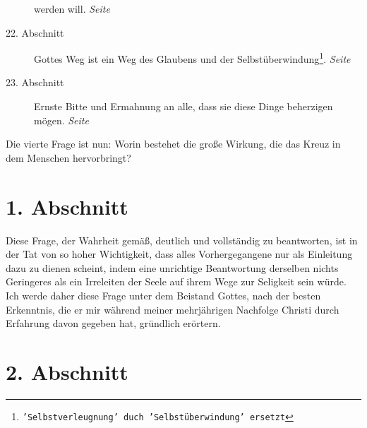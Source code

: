 \begin{description}
werden will.
\dotfill \textit{Seite~\pageref{kap4_ab21}}\\
\item[22. Abschnitt] Gottes Weg ist ein Weg des Glaubens und der
Selbstüberwindung\footnote{\texttt{'Selbstverleugnung' duch 'Selbstüberwindung'
ersetzt}}.
\dotfill \textit{Seite~\pageref{kap4_ab22}}\\
\item[23. Abschnitt] Ernste Bitte und Ermahnung an alle, dass sie diese Dinge
beherzigen mögen.
\dotfill \textit{Seite~\pageref{kap4_ab23}}\\
\end{description}

\newpage

Die vierte Frage ist nun: Worin bestehet die große Wirkung, die das Kreuz in dem
Menschen hervorbringt?


\section{1. Abschnitt} \label{kap4_ab1}

Diese Frage, der Wahrheit gemäß, deutlich und vollständig zu beantworten, ist in
der Tat von so hoher Wichtigkeit, dass alles Vorhergegangene nur als Einleitung
dazu zu dienen scheint, indem eine unrichtige Beantwortung derselben nichts
Geringeres als ein Irreleiten der Seele auf ihrem Wege zur Seligkeit sein würde.
Ich werde daher diese Frage unter dem Beistand Gottes, nach der besten
Erkenntnis, die er mir während meiner mehrjährigen Nachfolge Christi durch
Erfahrung davon gegeben hat, gründlich erörtern.

\section{2. Abschnitt} \label{kap4_ab2}


